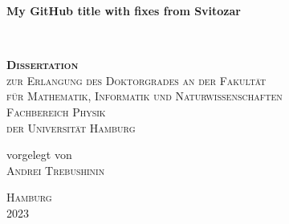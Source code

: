 
\begin{titlepage} %
\frontmatter


\vspace{2cm}
    \centering

	\vspace{0.4cm}
    \parbox[t]{0.96\textwidth}{\rmfamily \setlength\parfillskip{0pt} \def\baselinestretch{1.1}\centering\Huge \bfseries My GitHub title with fixes from Svitozar}\\
	\vspace{0.4cm}
    \vspace{2 cm} %
	
	
    \parbox[p]{0.95\textwidth}{\def\baselinestretch{1.4}\centering\scshape\textbf{\LARGE Dissertation} \\ {\large zur Erlangung des Doktorgrades an der Fakult{\"a}t\\ f{\"u}r Mathematik, Informatik und Naturwissenschaften \\ Fachbereich Physik \\ der Universit{\"a}t Hamburg} }
    
    \vspace{2 cm} %

    \parbox[b]{0.93\textwidth}{\def\baselinestretch{1.3}\centering\upshape \large vorgelegt von \\ {\LARGE\scshape  Andrei Trebushinin} \\ %
    }
    
    \vspace{2 cm} %
    
    \parbox[b]{0.93\textwidth}{\def\baselinestretch{1.3}\centering \large\scshape Hamburg\\\scshape 2023}

\end{titlepage}

